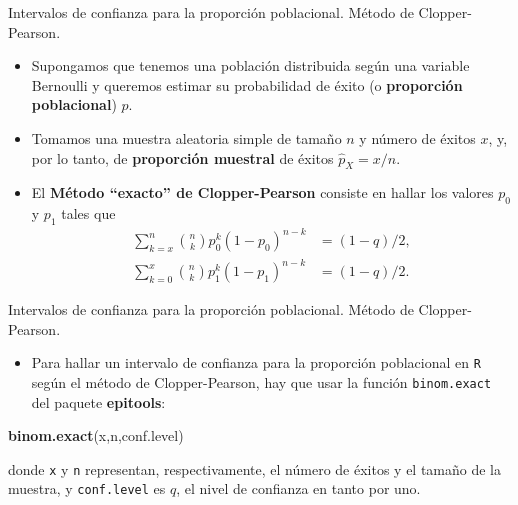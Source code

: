 \documentclass[ignorenonframetext,]{beamer}
\newenvironment{Shaded}{\begin{snugshade}}{\end{snugshade}}
\newcommand{\KeywordTok}[1]{\textcolor[rgb]{0.13,0.29,0.53}{\textbf{#1}}}
\newcommand{\NormalTok}[1]{#1}
\providecommand{\tightlist}{%
  \setlength{\itemsep}{0pt}\setlength{\parskip}{0pt}}
\begin{document}
\begin{frame}{Intervalos de confianza para la proporción poblacional.
Método de Clopper-Pearson.}
\protect\hypertarget{intervalos-de-confianza-para-la-proporcion-poblacional.-metodo-de-clopper-pearson.}{}

\begin{itemize}
\item
  Supongamos que tenemos una población distribuida según una variable
  Bernoulli y queremos estimar su probabilidad de éxito (o
  \textbf{proporción poblacional}) \(p\).
\item
  Tomamos una muestra aleatoria simple de tamaño \(n\) y número de
  éxitos \(x\), y, por lo tanto, de \textbf{proporción muestral} de
  éxitos \(\widehat{p}_X=x/n\).
\item
  El \textbf{Método ``exacto'' de Clopper-Pearson} consiste en hallar
  los valores \(p_0\) y \(p_1\) tales que \[
  \begin{array}{ll}
  \sum\limits_{k=x}^n\binom{n}{k}p_0^k(1-p_0)^{n-k} & =(1-q)/2,\\
  \sum\limits_{k=0}^x\binom{n}{k}p_1^k(1-p_1)^{n-k} & =(1-q)/2.
  \end{array}
  \]
\end{itemize}

\end{frame}

\begin{frame}[fragile]{Intervalos de confianza para la proporción
poblacional. Método de Clopper-Pearson.}
\protect\hypertarget{intervalos-de-confianza-para-la-proporcion-poblacional.-metodo-de-clopper-pearson.-1}{}

\begin{itemize}
\tightlist
\item
  Para hallar un intervalo de confianza para la proporción poblacional
  en \texttt{R} según el método de Clopper-Pearson, hay que usar la
  función \texttt{binom.exact} del paquete \textbf{epitools}:
\end{itemize}

\begin{Shaded}
\begin{Highlighting}[]
\KeywordTok{binom.exact}\NormalTok{(x,n,conf.level)}
\end{Highlighting}
\end{Shaded}

donde \texttt{x} y \texttt{n} representan, respectivamente, el número de
éxitos y el tamaño de la muestra, y \texttt{conf.level} es \(q\), el
nivel de confianza en tanto por uno.

\end{frame}
\end{document}
